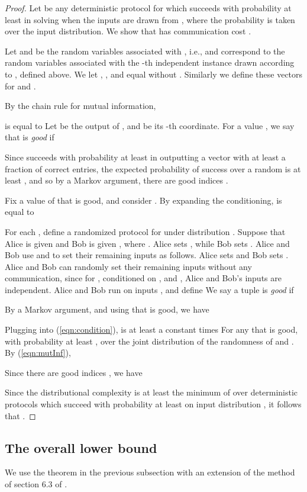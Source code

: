 \documentclass[twoside,leqno,twocolumn]{article}
\begin{document}
\begin{proof}
  Let  be any deterministic
  protocol for  which succeeds with probability at
  least  in solving  when the inputs are
  drawn from , where the probability is taken over the input
  distribution. We show that  has communication cost
  .

  Let  and 
  be the random variables associated with , i.e., 
   and  correspond to the random variables
   associated with the -th independent instance drawn
  according to , defined above. We let
  , , and
   equal  without . Similarly we define these
  vectors for  and .
 
By the chain rule for mutual information, 

is equal to 
Let  be the output of , and  be its -th coordinate. 
For a value , we say that  is {\it good} if

Since  succeeds with probability at least  in
outputting a vector with at least a  fraction of
correct entries, the expected probability of success over a random 
is at least , and so by a
Markov argument, there are  good indices .

Fix a value of  that is good, and consider .  By expanding the conditioning,  is equal to

For each , define a randomized protocol
 for  under distribution .
Suppose that Alice is given  and Bob is given , where . Alice sets , while Bob sets . Alice and Bob
use  and  to set their remaining inputs as follows.
Alice sets  and Bob sets .  Alice and
Bob can randomly set their remaining inputs without any communication, 
since for , conditioned on , and ,
Alice and Bob's inputs are independent.  
Alice and Bob run  on
inputs , and define  
We say a tuple  is {\it good} if

By a Markov argument, and using that  is good, we have 

Plugging into (\ref{eqn:condition}), 
 is at least a constant times
 For any  that
is good,  with
probability at least , over the joint distribution of the
randomness of  and . 
By (\ref{eqn:mutInf}),

Since there are  good indices , we have 

Since the distributional complexity  is at least the
minimum of  over 
deterministic protocols  which succeed with probability at least
 on input distribution , it follows that
.
\end{proof}

\subsection{The overall lower bound}\label{sec:cc2}
We use the theorem in the previous subsection with an extension of the method of section 6.3
of \cite{PW11}. 
\end{document}
